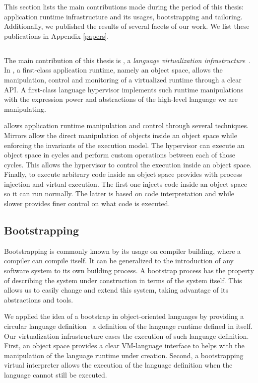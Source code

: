 This section lists the main contributions made during the period of this thesis: \Vtt application runtime infrastructure and its usages, bootstrapping and tailoring. Additionally, we published the results of several facets of our work. We list these publications in Appendix \ref{papers}.

\subsection{\Vtt}
The main contribution of this thesis is \Vtt, a \emph{language virtualization infrastructure}~\cite{Poli13a}. In \Vtt, a first-class application runtime, namely an object space, allows the manipulation, control and monitoring of a virtualized runtime through a clear API. A first-class language hypervisor implements such runtime manipulations with the expression power and abstractions of the high-level language we are manipulating.

\Vtt allows application runtime manipulation and control through several techniques. Mirrors allow the direct manipulation of objects inside an object space while enforcing the invariants of the \VM execution model. The hypervisor can execute an object space in cycles and perform custom operations between each of those cycles. This allows the hypervisor to control the execution inside an object space. Finally, to execute arbitrary code inside an object space \Vtt provides with process injection and virtual execution. The first one injects code inside an object space so it can run normally. The latter is based on code interpretation and while slower provides finer control on what code is executed. 

\subsection{Bootstrapping}
Bootstrapping is commonly known by its usage on compiler building, where a compiler can compile itself.
It can be generalized to the introduction of any software system to its own building process.
A bootstrap process has the property of describing the system under construction in terms of the system itself. This allows us to easily change and extend this system, taking advantage of its abstractions and tools.

We applied the idea of a bootstrap in object-oriented languages by providing a circular language definition~\cite{Poli14c} \ie a definition of the language runtime defined in itself.
Our virtualization infrastructure eases the execution of such language definition. First, an object space provides a clear VM-language interface to helps with the manipulation of the language runtime under creation. Second, a bootstrapping virtual interpreter allows the execution of the language definition when the language cannot still be executed.

